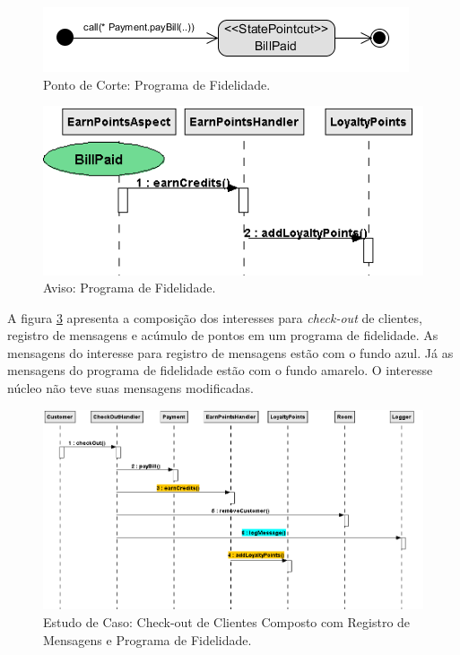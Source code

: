   \begin{figure}
	\centering
	\includegraphics{img/case_study_behavioral_pointcut_loyalty_points.png}
	\caption{Ponto de Corte: Programa de Fidelidade.}\label{fig:case_study_behavioral_pointcut_loyalty_points}
  \end{figure}

  \begin{figure}
	\centering
	\includegraphics{img/case_study_behavioral_loyalty_points.png}
	\caption{Aviso: Programa de Fidelidade.}\label{fig:case_study_behavioral_loyalty_points}
  \end{figure}
  
A figura \ref{fig:case_study_2_compound} apresenta a composição dos interesses para \textit{check-out} de clientes, registro de mensagens e acúmulo
de pontos em um programa de fidelidade. As mensagens do interesse para registro de mensagens estão com o fundo azul. Já as mensagens do programa de
fidelidade estão com o fundo amarelo. O interesse núcleo não teve suas mensagens modificadas. 
  
  \begin{landscape}
  \begin{figure}[tb]
	\centering
	\includegraphics[scale=0.7]{img/case_study_2_compound.png}
	\caption{Estudo de Caso: Check-out de Clientes Composto com Registro de Mensagens e Programa de Fidelidade.}\label{fig:case_study_2_compound}
  \end{figure}
\end{landscape}
  
